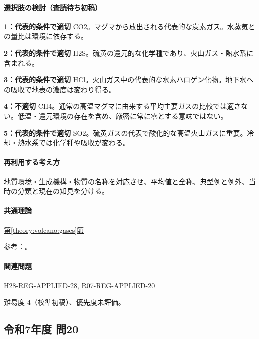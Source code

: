 \paragraph{選択肢の検討（査読待ち初稿）}\mbox{}\par

\noindent\textbf{1：代表的条件で適切} CO2。マグマから放出される代表的な炭素ガス。水蒸気との量比は環境に依存する。\par

\noindent\textbf{2：代表的条件で適切} H2S。硫黄の還元的な化学種であり、火山ガス・熱水系に含まれる。\par

\noindent\textbf{3：代表的条件で適切} HCl。火山ガス中の代表的な水素ハロゲン化物。地下水への吸収で地表の濃度は変わり得る。\par

\noindent\textbf{4：不適切} CH4。通常の高温マグマに由来する平均主要ガスの比較では適さない。低温・還元環境の存在を含め、厳密に常に零とする意味ではない。\par

\noindent\textbf{5：代表的条件で適切} SO2。硫黄ガスの代表で酸化的な高温火山ガスに重要。冷却・熱水系では化学種や吸収が変わる。\par

\paragraph{再利用する考え方} 地質環境・生成機構・物質の名称を対応させ、平均値と全称、典型例と例外、当時の分類と現在の知見を分ける。

\paragraph{共通理論} \hyperref[theory:volcano:gases]{第\ref*{theory:volcano:gases}節}

\par 参考：\cite{vol50_gas_ref}。

\paragraph{関連問題} \hyperref[q:h28-reg-applied-28]{H28-REG-APPLIED-28}, \hyperref[q:r07-reg-applied-20]{R07-REG-APPLIED-20}

\par 難易度 4（校準初稿）、優先度未評価。

\subsection{令和7年度 問20}
\label{q:r07-reg-applied-20}

